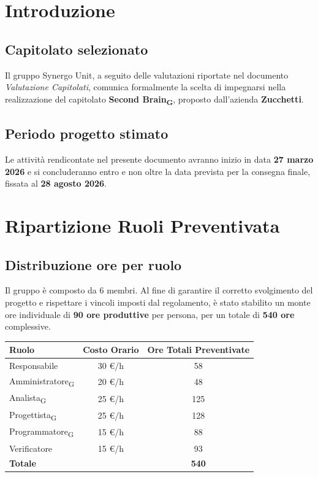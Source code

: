 \documentclass[11pt, a4paper]{article}
\begin{document}
	\section{Introduzione}
	
	\subsection{Capitolato selezionato}
	Il gruppo Synergo Unit, a seguito delle valutazioni riportate nel documento \textit{Valutazione Capitolati}, comunica formalmente la scelta di impegnarsi nella realizzazione del capitolato \textbf{{Second Brain\textsubscript{G}}}, proposto dall'azienda \textbf{{Zucchetti}}.
	
	\subsection{Periodo progetto stimato}
	Le attività rendicontate nel presente documento avranno inizio in data \textbf{{27 marzo 2026}} e si concluderanno entro e non oltre la data prevista per la consegna finale, fissata al \textbf{{28 agosto 2026}}.
	
	\newpage
	\section{Ripartizione Ruoli Preventivata}
	
	\subsection{Distribuzione ore per ruolo}
	Il gruppo è composto da 6 membri. Al fine di garantire il corretto svolgimento del progetto e rispettare i vincoli imposti dal regolamento, è stato stabilito un monte ore individuale di \textbf{90 ore produttive} per persona, per un totale di \textbf{540 ore} complessive.
	
	\begin{table}[H]
		\centering
		\renewcommand{\arraystretch}{1.3}
		\begin{tabularx}{0.9\textwidth}{|X|c|c|}
			\hline
			\rowcolor{primarycolor!10}
			\textbf{Ruolo} & \textbf{Costo Orario} & \textbf{Ore Totali Preventivate} \\
			\hline
			Responsabile & 30 \euro/h & 58 \\
			\hline
			Amministratore\textsubscript{G} & 20 \euro/h & 48 \\
			\hline
			Analista\textsubscript{G} & 25 \euro/h & 125 \\
			\hline
			Progettista\textsubscript{G} & 25 \euro/h & 128 \\
			\hline
			Programmatore\textsubscript{G} & 15 \euro/h & 88 \\
			\hline
			Verificatore & 15 \euro/h & 93 \\
			\hline
			\rowcolor{lightgray}
			\textbf{Totale} & & \textbf{540} \\
			\hline
		\end{tabularx}
	\end{table}
	
\end{document}
